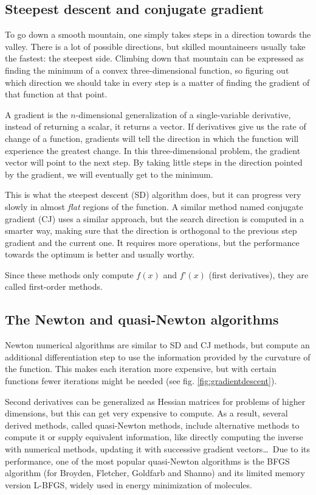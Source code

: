 \subsection{Steepest descent and conjugate gradient}
To go down a smooth mountain, one simply takes steps in a direction towards the valley. There is a lot of possible directions, but skilled mountaineers usually take the fastest: the steepest side. Climbing down that mountain can be expressed as finding the minimum of a convex three-dimensional function, so figuring out which direction we should take in every step is a matter of finding the gradient of that function at that point.

A gradient is the $n$-dimensional generalization of a single-variable derivative, instead of returning a scalar, it returns a vector. If derivatives give us the rate of change of a function, gradients will tell the direction in which the function will experience the greatest change. In this three-dimensional problem, the gradient vector will point to the next step. By taking little steps in the direction pointed by the gradient, we will eventually get to the minimum.

This is what the steepest descent (SD) algorithm does, but it can progress very slowly in almost \textit{flat} regions of the function. A similar method named conjugate gradient (CJ) uses a similar approach, but the search direction is computed in a smarter way, making sure that the direction is orthogonal to the previous step gradient and the current one. It requires more operations, but the performance towards the optimum is better and usually worthy.

Since these methods only compute $f(x)$ and $f’(x)$ (first derivatives), they are called first-order methods.

\subsection{The Newton and quasi-Newton algorithms}
Newton numerical algorithms are similar to SD and CJ methods, but compute an additional differentiation step to use the information provided by the curvature of the function. This makes each iteration more expensive, but with certain functions fewer iterations might be needed (see fig. \ref{fig:gradientdescent}).

Second derivatives can be generalized as Hessian matrices for problems of higher dimensions, but this can get very expensive to compute. As a result, several derived methods, called quasi-Newton methods, include alternative methods to compute it or supply equivalent information, like directly computing the inverse with numerical methods, updating it with successive gradient vectors\ldots\ Due to its performance, one of the most popular quasi-Newton algorithms is the BFGS algorithm (for Broyden,\cite{broyden1970convergence} Fletcher,\cite{fletcher1970new} Goldfarb\cite{goldfarb1970family} and Shanno\cite{shanno1970conditioning}) and its limited memory version L-BFGS,\cite{liu1989limited} widely used in energy minimization of molecules.

